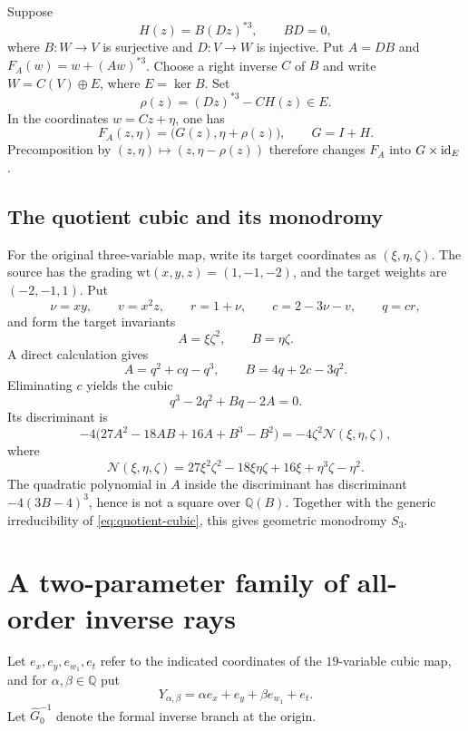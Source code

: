 \begin{proposition}
Suppose
\[
H(z)=B(Dz)^{*3},\qquad BD=0,
\]
where $B:W\to V$ is surjective and $D:V\to W$ is injective.  Put $A=DB$ and
$F_A(w)=w+(Aw)^{*3}$.  Choose a right inverse $C$ of $B$ and write
$W=C(V)\oplus E$, where $E=\ker B$.  Set
\[
\rho(z)=(Dz)^{*3}-CH(z)\in E.
\]
In the coordinates $w=Cz+\eta$, one has
\[
F_A(z,\eta)=\bigl(G(z),\eta+\rho(z)\bigr),
\qquad G=I+H.
\]
Precomposition by $(z,\eta)\mapsto(z,\eta-\rho(z))$ therefore changes $F_A$
into $G\times\operatorname{id}_E$.
\end{proposition}

\subsection{The quotient cubic and its monodromy}

For the original three-variable map, write its target coordinates as
$(\xi,\eta,\zeta)$.  The source has the grading
$\mathrm{wt}(x,y,z)=(1,-1,-2)$, and the target weights are $(-2,-1,1)$.
Put
\[
\nu=xy,\qquad v=x^2z,\qquad r=1+\nu,
\qquad c=2-3\nu-v,\qquad q=cr,
\]
and form the target invariants
\[
A=\xi\zeta^2,\qquad B=\eta\zeta.
\]
A direct calculation gives
\[
A=q^2+cq-q^3,\qquad B=4q+2c-3q^2.
\]
Eliminating $c$ yields the cubic
\begin{equation}
\label{eq:quotient-cubic}
q^3-2q^2+Bq-2A=0.
\end{equation}
Its discriminant is
\[
-4\bigl(27A^2-18AB+16A+B^3-B^2\bigr)
 =-4\zeta^2\mathscr N(\xi,\eta,\zeta),
\]
where
\begin{equation}
\label{eq:nonproperness-polynomial}
\mathscr N(\xi,\eta,\zeta)
 =27\xi^2\zeta^2-18\xi\eta\zeta+16\xi
  +\eta^3\zeta-\eta^2.
\end{equation}
The quadratic polynomial in $A$ inside the discriminant has discriminant
$-4(3B-4)^3$, hence is not a square over $\mathbb Q(B)$.  Together with the
generic irreducibility of \eqref{eq:quotient-cubic}, this gives geometric
monodromy $S_3$.

\section{A two-parameter family of all-order inverse rays}
\label{sec:all-order-rays}

Let $e_x,e_y,e_{w_1},e_t$ refer to the indicated coordinates of the
$19$-variable cubic map, and for $\alpha,\beta\in\mathbb Q$ put
\[
Y_{\alpha,\beta}
 =\alpha e_x+e_y+\beta e_{w_1}+e_t.
\]
Let $\widehat G^{-1}_0$ denote the formal inverse branch at the origin.

